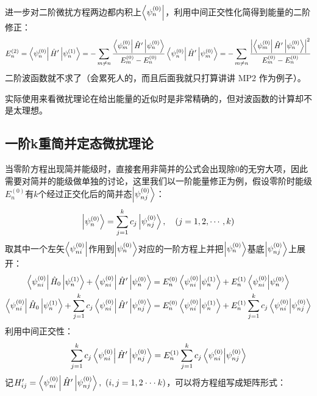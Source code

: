 进一步对二阶微扰方程两边都内积上$\bra{\psi_n^{(0)}}$，利用中间正交性化简得到能量的二阶修正：
\[E_n^{(2)}=\bra{\psi_n^{(0)}}\hat{H}'\ket{\psi_n^{(1)}}=-\sum_{m\neq n}\frac{\bra{\psi_m^{(0)}}\hat{H}'\ket{\psi_n^{(0)}}}{E_m^{(0)}-E_n^{(0)}}\bra{\psi_n^{(0)}}\hat{H}'\ket{\psi_m^{(0)}}=-\sum_{m\neq n}\frac{\left|\bra{\psi_m^{(0)}}\hat{H}'\ket{\psi_n^{(0)}}\right|^2}{E_m^{(0)}-E_n^{(0)}}\]
二阶波函数就不求了（会累死人的，而且后面我就只打算讲讲 MP2 作为例子）。

实际使用来看微扰理论在给出能量的近似时是非常精确的，但对波函数的计算却不是太理想。

\subsection{一阶k重简并定态微扰理论}
当零阶方程出现简并能级时，直接套用非简并的公式会出现除0的无穷大项，因此需要对简并的能级做单独的讨论，这里我们以一阶能量修正为例，假设零阶时能级$E_n^{(0)}$有$k$个经过正交化后的简并态$\ket{\psi_{nj}^{(0)}}$：
\[\ket{\psi_{n}^{(0)}}=\sum_{j=1}^{k}c_j\ket{\psi_{nj}^{(0)}}, \quad (j=1,2,\cdots,k)\]
取其中一个左矢$\bra{\psi_{ni}^{(0)}}$作用到$\ket{\psi_{n}^{(0)}}$对应的一阶方程上并把$\ket{\psi_{n}^{(0)}}$基底$\ket{\psi_{nj}^{(0)}}$上展开：
\[\begin{aligned}
\bra{\psi_{ni}^{(0)}}\hat{H}_0\ket{\psi_{n}^{(1)}}+\bra{\psi_{ni}^{(0)}}\hat{H}'\ket{\psi_{n}^{(0)}}&=E_n^{(0)}\bra{\psi_{ni}^{(0)}}\ket{\psi_{n}^{(1)}}+E_n^{(1)}\bra{\psi_{ni}^{(0)}}\ket{\psi_{n}^{(0)}}\\
\bra{\psi_{ni}^{(0)}}\hat{H}_0\ket{\psi_{n}^{(1)}}+\sum_{j=1}^{k}c_j\bra{\psi_{ni}^{(0)}}\hat{H}'\ket{\psi_{nj}^{(0)}}&=E_n^{(0)}\bra{\psi_{ni}^{(0)}}\ket{\psi_{n}^{(1)}}+E_n^{(1)}\sum_{j=1}^{k}c_j\bra{\psi_{ni}^{(0)}}\ket{\psi_{nj}^{(0)}}\\
\end{aligned}\]
利用中间正交性：
\[\sum_{j=1}^{k}c_j\bra{\psi_{ni}^{(0)}}\hat{H}'\ket{\psi_{nj}^{(0)}}=E_n^{(1)}\sum_{j=1}^{k}c_j\bra{\psi_{ni}^{(0)}}\ket{\psi_{nj}^{(0)}}\]
记$H'_{ij}=\bra{\psi_{ni}^{(0)}}\hat{H}'\ket{\psi_{nj}^{(0)}}, \ (i,j=1,2 \cdot\cdot\cdot k)$，可以将方程组写成矩阵形式：
